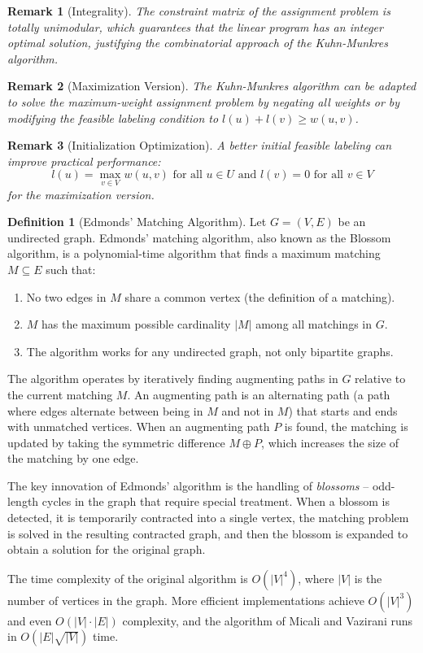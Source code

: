 \documentclass{article}
\newtheorem{remark}{Remark}
\theoremstyle{definition}
\newtheorem{definition}{Definition}
\begin{document}
\begin{remark}[Integrality]
The constraint matrix of the assignment problem is totally unimodular, which guarantees that the linear program has an integer optimal solution, justifying the combinatorial approach of the Kuhn-Munkres algorithm.
\end{remark}


\begin{remark}[Maximization Version]
The Kuhn-Munkres algorithm can be adapted to solve the maximum-weight assignment problem by negating all weights or by modifying the feasible labeling condition to $l(u) + l(v) \geq w(u,v)$.
\end{remark}

\begin{remark}[Initialization Optimization]
A better initial feasible labeling can improve practical performance:
\begin{equation}
l(u) = \max_{v \in V} w(u,v) \text{ for all } u \in U \text{ and } l(v) = 0 \text{ for all } v \in V
\end{equation}
for the maximization version.
\end{remark}
\begin{definition}[Edmonds' Matching Algorithm]
Let $G = (V, E)$ be an undirected graph. Edmonds' matching algorithm, also known as the Blossom algorithm, is a polynomial-time algorithm that finds a maximum matching $M \subseteq E$ such that:
\begin{enumerate}
  \item No two edges in $M$ share a common vertex (the definition of a matching).
  \item $M$ has the maximum possible cardinality $|M|$ among all matchings in $G$.
  \item The algorithm works for any undirected graph, not only bipartite graphs.
\end{enumerate}

The algorithm operates by iteratively finding augmenting paths in $G$ relative to the current matching $M$. An augmenting path is an alternating path (a path where edges alternate between being in $M$ and not in $M$) that starts and ends with unmatched vertices. When an augmenting path $P$ is found, the matching is updated by taking the symmetric difference $M \oplus P$, which increases the size of the matching by one edge.

The key innovation of Edmonds' algorithm is the handling of \textit{blossoms} -- odd-length cycles in the graph that require special treatment. When a blossom is detected, it is temporarily contracted into a single vertex, the matching problem is solved in the resulting contracted graph, and then the blossom is expanded to obtain a solution for the original graph.

The time complexity of the original algorithm is $O(|V|^4)$, where $|V|$ is the number of vertices in the graph. More efficient implementations achieve $O(|V|^3)$ and even $O(|V| \cdot |E|)$ complexity, and the algorithm of Micali and Vazirani runs in $O(|E|\sqrt{|V|})$ time.
\end{definition}
\end{document}
